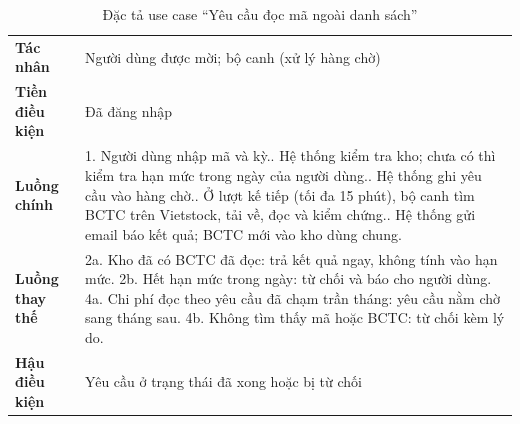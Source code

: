 \documentclass[12pt,a4paper]{report}
\newcommand{\enquote}[1]{“#1”}
\begin{document}
\begin{table}[H]
\centering\small
\caption{Đặc tả use case \enquote{Yêu cầu đọc mã ngoài danh sách}}\label{tab:uc-yeucau}
\begin{tabularx}{\linewidth}{@{}>{\bfseries}p{3.2cm}X@{}}
\toprule
Tác nhân & Người dùng được mời; bộ canh (xử lý hàng chờ) \\
Tiền điều kiện & Đã đăng nhập \\
Luồng chính & 1. Người dùng nhập mã và kỳ.\newline
2. Hệ thống kiểm tra kho; chưa có thì kiểm tra hạn mức trong ngày của người dùng.\newline
3. Hệ thống ghi yêu cầu vào hàng chờ.\newline
4. Ở lượt kế tiếp (tối đa 15 phút), bộ canh tìm BCTC trên Vietstock, tải về, đọc và kiểm chứng.\newline
5. Hệ thống gửi email báo kết quả; BCTC mới vào kho dùng chung. \\
Luồng thay thế & 2a. Kho đã có BCTC đã đọc: trả kết quả ngay, không tính vào hạn mức.\newline
2b. Hết hạn mức trong ngày: từ chối và báo cho người dùng.\newline
4a. Chi phí đọc theo yêu cầu đã chạm trần tháng: yêu cầu nằm chờ sang tháng sau.\newline
4b. Không tìm thấy mã hoặc BCTC: từ chối kèm lý do. \\
Hậu điều kiện & Yêu cầu ở trạng thái đã xong hoặc bị từ chối \\
\bottomrule
\end{tabularx}
\end{table}
\end{document}
